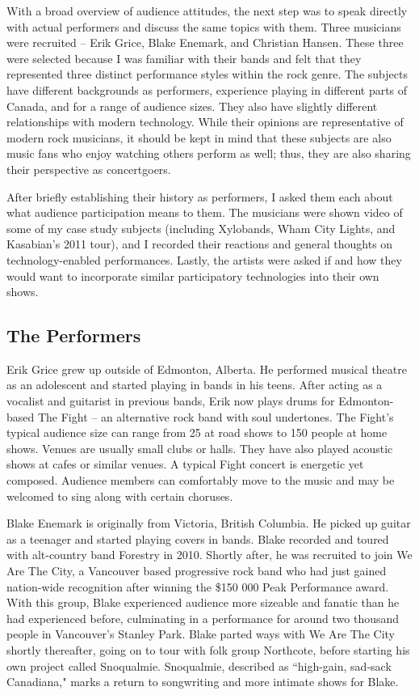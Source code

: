 With a broad overview of audience attitudes, the next step was to speak directly with actual performers and discuss the same topics with them. Three musicians were recruited -- Erik Grice, Blake Enemark, and Christian Hansen. These three were selected because I was familiar with their bands and felt that they represented three distinct performance styles within the rock genre. The subjects have different backgrounds as performers, experience playing in different parts of Canada, and for a range of audience sizes. They also have slightly different relationships with modern technology. While their opinions are representative of modern rock musicians, it should be kept in mind that these subjects are also music fans who enjoy watching others perform as well; thus, they are also sharing their perspective as concertgoers.

After briefly establishing their history as performers, I asked them each about what audience participation means to them. The musicians were shown video of some of my case study subjects (including Xylobands, Wham City Lights, and Kasabian's 2011 tour), and I recorded their reactions and general thoughts on technology-enabled performances. Lastly, the artists were asked if and how they would want to incorporate similar participatory technologies into their own shows.

\subsection{The Performers}

Erik Grice grew up outside of Edmonton, Alberta. He performed musical theatre as an adolescent and started playing in bands in his teens. After acting as a vocalist and guitarist in previous bands, Erik now plays drums for Edmonton-based The Fight -- an alternative rock band with soul undertones. The Fight's typical audience size can range from 25 at road shows to 150 people at home shows. Venues are usually small clubs or halls. They have also played acoustic shows at cafes or similar venues. A typical Fight concert is energetic yet composed. Audience members can comfortably move to the music and may be welcomed to sing along with certain choruses.

Blake Enemark is originally from Victoria, British Columbia. He picked up guitar as a teenager and started playing covers in bands. Blake recorded and toured with alt-country band Forestry in 2010. Shortly after, he was recruited to join We Are The City, a Vancouver based progressive rock band who had just gained nation-wide recognition after winning the \$150 000 Peak Performance award. With this group, Blake experienced audience more sizeable and fanatic than he had experienced before, culminating in a performance for around two thousand people in Vancouver's Stanley Park. Blake parted ways with We Are The City shortly thereafter, going on to tour with folk group Northcote, before starting his own project called Snoqualmie. Snoqualmie, described as ``high-gain, sad-sack Canadiana," marks a return to songwriting and more intimate shows for Blake.

